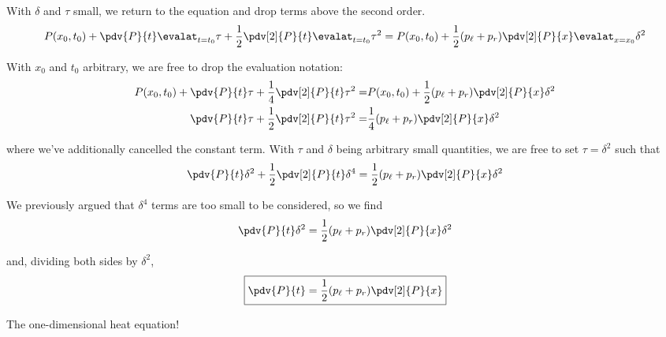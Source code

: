 \documentclass{article}
\begin{document}
With $ \delta $ and $ \tau $ small, we return to the equation and drop 
terms above the second order. 
\begin{equation*}
	P(x_0,t_0) + \pdv{P}{t}\evalat_{t=t_0}^{} \tau + \frac{1}{2}\pdv[2]{P}{t}
	\evalat_{t=t_0}^{} \tau^2 
	= P(x_0, t_0) + \frac{1}{2}(p_\ell + p_r) \pdv[2]{P}{x} \evalat_{x=x_0}^{}\delta^2
\end{equation*}

With $ x_0 $ and $ t_0 $ arbitrary, we are free to drop the evaluation notation: 
\begin{align*}
	P(x_0,t_0) + \pdv{P}{t} \tau + \frac{1}{4}\pdv[2]{P}{t} \tau^2 
	=& P(x_0, t_0) + \frac{1}{2}(p_\ell + p_r) \pdv[2]{P}{x} \delta^2\\
	\pdv{P}{t} \tau + \frac{1}{2}\pdv[2]{P}{t} \tau^2 
	=& \frac{1}{4}(p_\ell + p_r) \pdv[2]{P}{x} \delta^2
\end{align*}

where we've additionally cancelled the constant term. With $ \tau $ and $
\delta $ being arbitrary small quantities, we are free  to set $\tau= \delta^2 $ 
such that 
\begin{equation*}
	\pdv{P}{t} \delta^2 + \frac{1}{2}\pdv[2]{P}{t} \delta^4 
	= \frac{1}{2}(p_\ell + p_r) \pdv[2]{P}{x} \delta^2
\end{equation*}

We previously argued that $ \delta^4 $ terms are too small to be considered, so 
we find 
\begin{equation*}
	\pdv{P}{t} \delta^2 
	= \frac{1}{2}(p_\ell + p_r) \pdv[2]{P}{x} \delta^2
\end{equation*}

and, dividing both sides by $ \delta^2 $, 
\begin{equation*}
	\boxed{
	\pdv{P}{t} 
	= \frac{1}{2}(p_\ell + p_r) \pdv[2]{P}{x} }
\end{equation*}

The one-dimensional heat equation!
\end{document}
